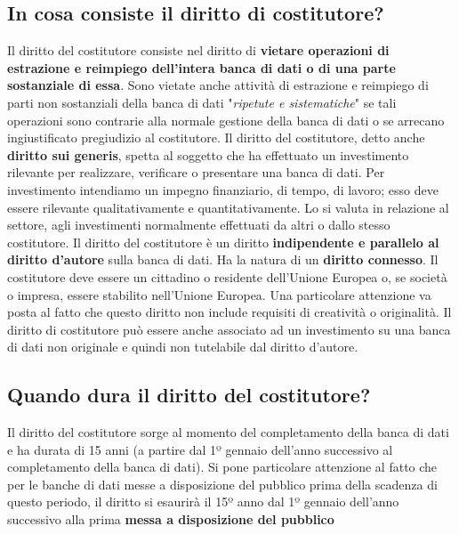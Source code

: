 \subsection{In cosa consiste il diritto di costitutore?}
Il diritto del costitutore consiste nel diritto di \textbf{vietare operazioni di estrazione e reimpiego dell'intera banca di dati
o di una parte sostanziale di essa}.\newline
Sono vietate anche attività di estrazione e reimpiego di parti non sostanziali della banca di dati
"\emph{ripetute e sistematiche}" se
tali operazioni sono contrarie alla normale gestione della banca di dati o se arrecano ingiustificato pregiudizio al
costitutore.\newline
Il diritto del costitutore, detto anche \textbf{diritto sui generis}, spetta al soggetto che ha effettuato un
investimento rilevante per realizzare, verificare o presentare una banca di dati.\newline
Per investimento intendiamo un impegno finanziario, di tempo, di lavoro; esso deve essere rilevante
qualitativamente e quantitativamente. Lo si valuta in relazione al settore, agli investimenti normalmente effettuati
da altri o dallo stesso costitutore.\newline
Il diritto del costitutore è un diritto \textbf{indipendente e parallelo al diritto d'autore} sulla banca di dati. Ha la natura di un \textbf{diritto connesso}.\newline
Il costitutore deve essere un cittadino o residente dell'Unione Europea o, se società o impresa, essere
stabilito nell'Unione Europea.\newline
Una particolare attenzione va posta al fatto che questo diritto non include requisiti di creatività o originalità.
Il diritto di costitutore può essere anche associato ad un investimento su una banca di dati non originale e quindi non
tutelabile dal diritto d'autore.\newline

\subsection{Quando dura il diritto del costitutore?}
Il diritto del costitutore sorge al momento del completamento della banca di dati e ha durata di 15 anni
(a partire dal 1º gennaio dell'anno successivo al completamento della banca di dati).\newline
Si pone particolare attenzione al fatto che per le banche di dati messe a disposizione del pubblico prima della
scadenza di questo periodo, il diritto si esaurirà il 15º anno dal 1º gennaio dell'anno
successivo alla prima \textbf{messa a disposizione del pubblico}

